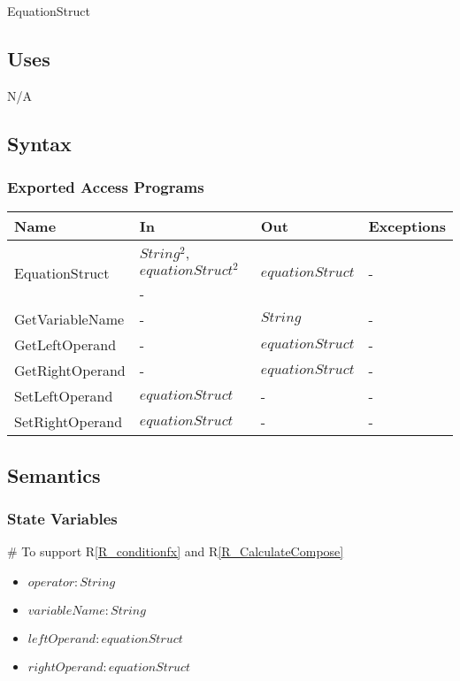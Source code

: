 \documentclass[12pt, titlepage]{article}
\newcommand{\rref}[1]{R\ref{#1}}
\begin{document}
EquationStruct

\subsection{Uses}

N/A

\subsection{Syntax}

\subsubsection{Exported Access Programs}

\begin{center}
	\begin{tabular}{p{3cm} p{3cm} p{3cm} p{5cm}}
		\hline
		\textbf{Name} & \textbf{In} & \textbf{Out} & \textbf{Exceptions} \\
		\hline
		\multirow{2}{3cm}{EquationStruct} & $String^2$, $equationStruct^2$ & 
		\multirow{2}{3cm}{$equationStruct$} & 
		\multirow{2}{5cm}{-}\\
		GetOperator & - & $String$ & - \\
		GetVariableName & - & $String$ & - \\
		GetLeftOperand & - & $equationStruct$ & -\\
		GetRightOperand & - & $equationStruct$ & - \\
		SetLeftOperand & $equationStruct$ & - & - \\
		SetRightOperand & $equationStruct$ & - & - \\
		\hline
	\end{tabular}
\end{center}

\subsection{Semantics}

\subsubsection{State Variables}

\# To support \rref{R_conditionfx} and \rref{R_CalculateCompose}
\begin{itemize}
	\item $operator : String$
	\item $variableName : String$
	\item $leftOperand : equationStruct$
	\item $rightOperand : equationStruct$
\end{itemize}
\end{document}
